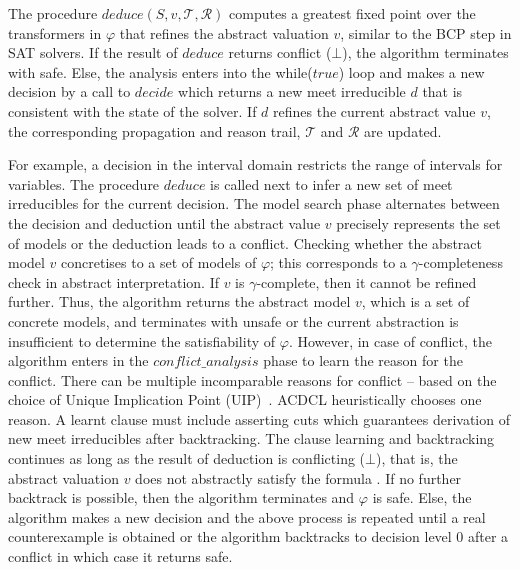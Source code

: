 The procedure $deduce(S,v,\mathcal{T},\mathcal{R})$ computes a greatest 
fixed point over the transformers in $\varphi$ that refines the abstract valuation 
$v$, similar to the BCP step in SAT solvers.  If the result of $deduce$ 
returns \textsf{conflict} ($\bot$), the algorithm terminates with \textsf{safe}. 
Else, the analysis enters into the while($true$) loop and makes a new decision 
by a call to $\mathit{decide}$ which returns a new meet irreducible $d$ that is
consistent with the state of the solver.  If $d$ refines the current abstract 
value $v$, the corresponding propagation and reason trail, $\mathcal{T}$ 
and $\mathcal{R}$ are updated. 

For example, a decision in the interval domain restricts the range of 
intervals for variables.
The procedure $deduce$ is called next to infer a new 
set of meet irreducibles for the current decision.  The model search phase 
alternates between the decision and deduction until the abstract value $v$ 
precisely  represents the set of models or the deduction leads to a \textsf{conflict}.  
Checking whether the abstract model $v$ concretises to a set of models of $\varphi$; this corresponds to a 
$\gamma$-completeness~\cite{dhk2013-popl} check in abstract interpretation.  
If $v$ is $\gamma$-complete, then it cannot be refined further.  Thus, the 
algorithm returns the abstract model $v$, which is a set of concrete models, and terminates with \textsf{unsafe} or the 
current abstraction is insufficient to determine the satisfiability of $\varphi$.  
However, in case of \textsf{conflict}, the algorithm enters in the 
$\mathit{conflict\_analysis}$ phase to learn the reason for the conflict.  
There can be multiple incomparable reasons for conflict -- based on 
the choice of Unique Implication Point (UIP)~\cite{cdcl}.  ACDCL heuristically 
chooses one reason.  A learnt clause must include asserting cuts which 
guarantees derivation of new meet irreducibles after backtracking. The clause 
learning and backtracking continues as long as the result of deduction 
is conflicting ($\bot$), that is, the abstract valuation $v$ does not
abstractly satisfy the formula .  If no further backtrack is possible, 
then the algorithm terminates and $\varphi$ is \textsf{safe}. Else, the 
algorithm makes a new decision and the above process is repeated 
until a real counterexample  is obtained or the algorithm backtracks to 
decision level 0 after a conflict in which case it returns \textsf{safe}. 

